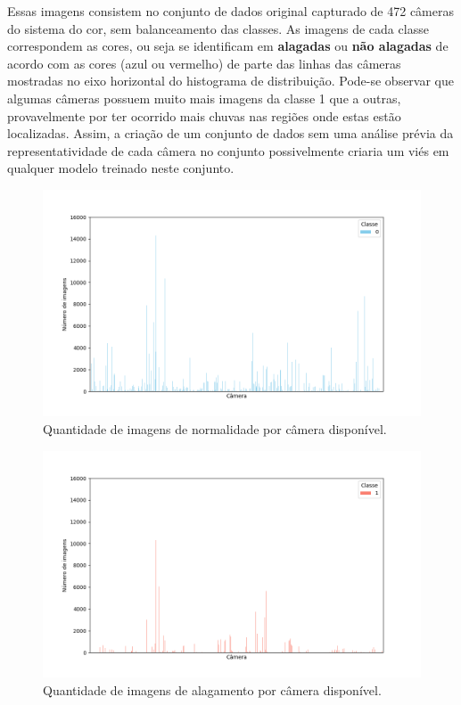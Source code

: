 Essas imagens consistem no conjunto de dados original capturado de 472 câmeras do sistema do \acrshort{cor}, sem balanceamento das classes. 
As imagens de cada classe correspondem as cores, ou seja se identificam em \textbf{alagadas} ou \textbf{não alagadas} de acordo com as cores (azul ou vermelho) de parte das linhas das câmeras mostradas no eixo horizontal do histograma de distribuição. 
Pode-se observar que algumas câmeras possuem muito mais imagens da classe 1 que a outras, provavelmente por ter ocorrido mais chuvas nas regiões onde estas estão localizadas. 
Assim, a criação de um conjunto de dados sem uma análise prévia da representatividade de cada câmera no conjunto possivelmente criaria um viés em qualquer modelo treinado neste conjunto.

\begin{figure}[htb]
    \centerline{\includegraphics[width=1\linewidth]{images/metodologia/class_0_count_code.png}}
    \caption{Quantidade de imagens de normalidade por câmera disponível.}
    \label{fig:class0count}
\end{figure}

\begin{figure}[htb]
    \centerline{\includegraphics[width=1\linewidth]{images/metodologia/class_1_count_code.png}}
    \caption{Quantidade de imagens de alagamento por câmera disponível.}
    \label{fig:class1count}
\end{figure}

